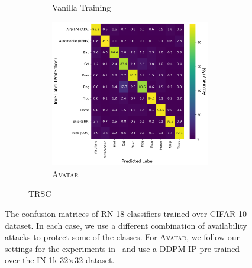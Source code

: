 \documentclass[conference]{IEEEtran}
\theoremstyle{definition}
\theoremstyle{remark}
\theoremstyle{proposition}
\begin{document}
\begin{figure}[p!]
\begin{subfigure}{1.0\textwidth}
\begin{subfigure}{.40\textwidth}
            \caption*{Vanilla Training}
    	\end{subfigure}
     \hspace{5em}
        \begin{subfigure}{.40\textwidth}
    		\centering
    		\includegraphics[width=1.0\textwidth]{combination_attacks/ResNet18_TRSC_t_200_confusion_matrix.png}
            \caption*{\textsc{Avatar}}
    	\end{subfigure}
	\caption{TRSC}
    \end{subfigure}
    \caption{The confusion matrices of RN-18 classifiers trained over CIFAR-10 dataset. In each case, we use a different combination of availability attacks to protect some of the classes. For \textsc{Avatar}, we follow our settings for the experiments in~ and use a DDPM-IP pre-trained over the IN-1k-32$\times$32 dataset.}
	\label{fig:combination_attacks}
\end{figure}
\end{document}
